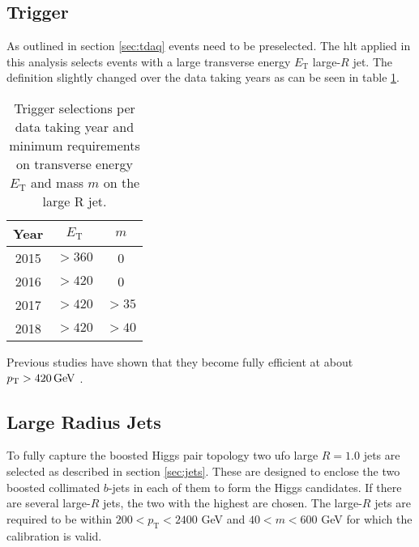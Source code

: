\subsection{Trigger}
As outlined in section \ref{sec:tdaq} events need to be preselected. The \ac{hlt} applied in this analysis selects events with a large transverse energy $E_\text{T}$ large-$R$ jet. The definition slightly changed over the data taking years as can be seen in table \ref{tab:trigger}.
\begin{table}[htbp]
    \centering
    \caption{Trigger selections per data taking year and minimum requirements on transverse energy $E_\text{T}$ and mass $m$ on the large R jet. }
    \begin{tabular}{ccc}
        \hline
        Year & $E_\text{T}$ & $m$   \\ \hline
        2015 & $>360$       & 0     \\
        2016 & $>420$       & 0     \\
        2017 & $>420$       & $>35$ \\
        2018 & $>420$       & $>40$ \\ \hline
    \end{tabular}
    \label{tab:trigger}
\end{table}
Previous studies have shown that they become fully efficient at about $p_{\text{T}}>\qty[]{420}{GeV}$ \citep{ATL-COM-PHYS-2020-083,ATL-COM-PHYS-2023-033}.

\subsection{Large Radius Jets}
To fully capture the boosted Higgs pair topology two \ac{ufo} large $R=1.0$ jets are selected as described in section \ref{sec:jets}. These are designed to enclose the two boosted collimated $b$-jets in each of them to form the Higgs candidates. If there are several large-$R$ jets, the two with the highest \pt are chosen. The large-$R$ jets are required to be within $200<p_{\text{T}}<2400$ GeV and $40<m<600$ GeV for which the calibration is valid.

